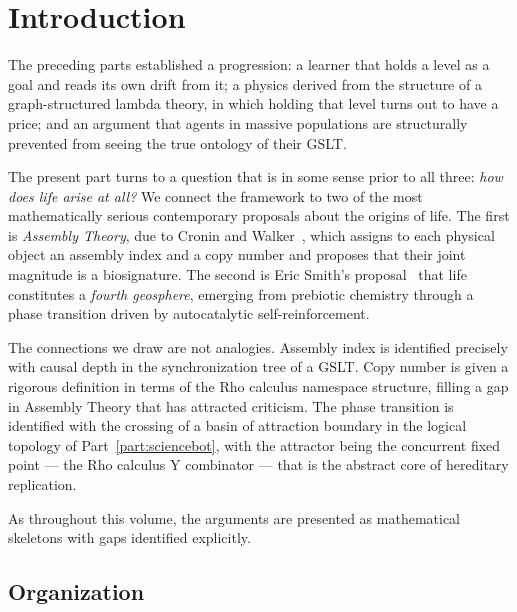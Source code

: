 \chapter{Introduction}
\label{sec:origins-intro}

The preceding parts established a progression: a learner that holds a
level as a goal and reads its own drift from it; a physics derived from
the structure of a graph-structured lambda theory, in which holding that
level turns out to have a price; and an argument that agents in massive
populations are structurally prevented from seeing the true ontology of
their GSLT.

The present part turns to a question that is in some sense prior to
all three: \emph{how does life arise at all?}
We connect the framework to two of the most mathematically serious
contemporary proposals about the origins of life.
The first is \emph{Assembly Theory}, due to Cronin and
Walker~\cite{cronin2023assembly}, which assigns to each physical
object an assembly index and a copy number and proposes that
their joint magnitude is a biosignature.
The second is Eric Smith's proposal~\cite{smith2016origin} that
life constitutes a \emph{fourth geosphere}, emerging from prebiotic
chemistry through a phase transition driven by autocatalytic
self-reinforcement.

The connections we draw are not analogies.
Assembly index is identified precisely with causal depth in the
synchronization tree of a GSLT.
Copy number is given a rigorous definition in terms of the
Rho calculus namespace structure, filling a gap in Assembly
Theory that has attracted criticism.
The phase transition is identified with the crossing of a basin
of attraction boundary in the logical topology of Part~\ref{part:sciencebot},
with the attractor being the concurrent fixed point --- the
Rho calculus Y combinator --- that is the abstract core of
hereditary replication.

As throughout this volume, the arguments are presented as
mathematical skeletons with gaps identified explicitly.

\section{Organization}

